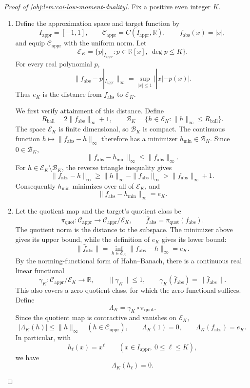 \begin{proof}[Proof of \cref{obj:lem:cai-low-moment-duality}]
Fix a positive even integer \(K\).

\begin{enumerate}
\item Define the approximation space and target function by
\[
I_{\mathrm{appr}}=[-1,1],\qquad
\mathcal C_{\mathrm{appr}}=C(I_{\mathrm{appr}},\mathbb R),\qquad
f_{\mathrm{abs}}(x)=|x|,
\]
and equip \(\mathcal C_{\mathrm{appr}}\) with the uniform norm. Let
\[
\mathcal E_K
=\{p|_{I_{\mathrm{appr}}}:p\in\mathbb R[x],\ \deg p\le K\}.
\]
For every real polynomial \(p\),
\[
\|f_{\mathrm{abs}}-p|_{I_{\mathrm{appr}}}\|_\infty
=\sup_{|x|\le1}\bigl||x|-p(x)\bigr|.
\]
Thus \(e_K\) is the distance from \(f_{\mathrm{abs}}\) to \(\mathcal E_K\).

We first verify attainment of this distance. Define
\[
R_{\mathrm{ball}}=2\|f_{\mathrm{abs}}\|_\infty+1,\qquad
\mathcal B_K
=\{h\in\mathcal E_K:\|h\|_\infty\le R_{\mathrm{ball}}\}.
\]
The space \(\mathcal E_K\) is finite dimensional, so \(\mathcal B_K\) is compact. The continuous function
\(h\mapsto\|f_{\mathrm{abs}}-h\|_\infty\) therefore has a minimizer
\(h_{\mathrm{min}}\in\mathcal B_K\). Since \(0\in\mathcal B_K\),
\[
\|f_{\mathrm{abs}}-h_{\mathrm{min}}\|_\infty
\le\|f_{\mathrm{abs}}\|_\infty.
\]
For \(h\in\mathcal E_K\setminus\mathcal B_K\), the reverse triangle inequality gives
\[
\|f_{\mathrm{abs}}-h\|_\infty
\ge\|h\|_\infty-\|f_{\mathrm{abs}}\|_\infty
>\|f_{\mathrm{abs}}\|_\infty+1.
\]
Consequently \(h_{\mathrm{min}}\) minimizes over all of \(\mathcal E_K\), and
\[
\|f_{\mathrm{abs}}-h_{\mathrm{min}}\|_\infty=e_K.
\]

\item Let the quotient map and the target's quotient class be
\[
\pi_{\mathrm{quot}}:\mathcal C_{\mathrm{appr}}
\longrightarrow\mathcal C_{\mathrm{appr}}/\mathcal E_K,
\qquad
\bar f_{\mathrm{abs}}=\pi_{\mathrm{quot}}(f_{\mathrm{abs}}).
\]
The quotient norm is the distance to the subspace. The minimizer above gives its upper bound, while the definition of \(e_K\) gives its lower bound:
\[
\|\bar f_{\mathrm{abs}}\|
=\inf_{h\in\mathcal E_K}\|f_{\mathrm{abs}}-h\|_\infty
=e_K.
\]
By the norming-functional form of Hahn--Banach, there is a continuous real linear functional
\[
\gamma_K:\mathcal C_{\mathrm{appr}}/\mathcal E_K\longrightarrow\mathbb R,
\qquad
\|\gamma_K\|\le1,\qquad
\gamma_K(\bar f_{\mathrm{abs}})=\|\bar f_{\mathrm{abs}}\|.
\]
This also covers a zero quotient class, for which the zero functional suffices. Define
\[
\Lambda_K=\gamma_K\circ\pi_{\mathrm{quot}}.
\]
Since the quotient map is contractive and vanishes on \(\mathcal E_K\),
\[
|\Lambda_K(h)|\le\|h\|_\infty
\quad(h\in\mathcal C_{\mathrm{appr}}),\qquad
\Lambda_K(1)=0,\qquad
\Lambda_K(f_{\mathrm{abs}})=e_K.
\]
In particular, with
\[
h_\ell(x)=x^\ell
\qquad(x\in I_{\mathrm{appr}},\ 0\le\ell\le K),
\]
we have
\[
\Lambda_K(h_\ell)=0.
\]


\end{enumerate}
\end{proof}
